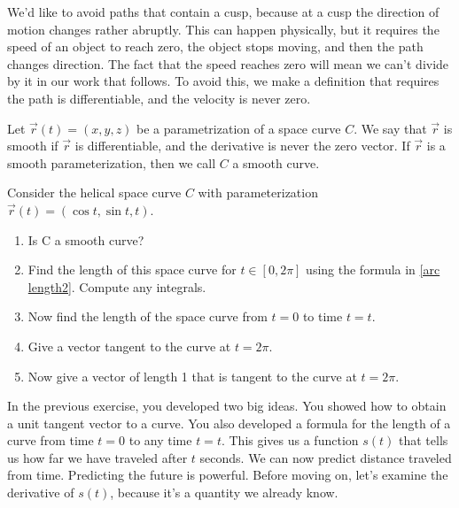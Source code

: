 We'd like to avoid paths that contain a cusp, because at a cusp the direction of motion changes rather abruptly. This can happen physically, but it requires the speed of an object to reach zero, the object stops moving, and then the path changes direction. The fact that the speed reaches zero will mean we can't divide by it in our work that follows.  To avoid this, we make a definition that requires the path is differentiable, and the velocity is never zero.

\begin{definition}\label{def:smooth curve}
 Let $\vec r(t)=(x,y,z)$ be a parametrization of a space curve $C$. We say that $\vec r$ is smooth if $\vec r$ is differentiable, and the derivative is never the zero vector. If $\vec r$ is a smooth parameterization, then we call $C$ a smooth curve. 
\end{definition}


\begin{problem}\label{prob:basic helix}
%
%
 Consider the helical space curve $C$ with parameterization $\vec r(t)=(\cos t, \sin t, t)$. 
\begin{enumerate}
	\item Is C a smooth curve?  
	\item Find the length of this space curve for $t\in[0,2\pi]$ using the formula in \ref{arc length2}. Compute any integrals. 
	\item Now find the length of the space curve from $t=0$ to time $t=t$. 
	\item Give a vector tangent to the curve at $t=2\pi$.
	\item Now give a vector of length 1 that is tangent to the curve at $t=2\pi$. 
\end{enumerate}
\end{problem}

In the previous exercise, you developed two big ideas.  You showed how to obtain a unit tangent vector to a curve. You also developed a formula for the length of a curve from time $t=0$ to any time $t=t$.  This gives us a function $s(t)$ that tells us how far we have traveled after $t$ seconds. We can now predict distance traveled from time. Predicting the future is powerful. Before moving on, let's examine the derivative of $s(t)$, because it's a quantity we already know.

